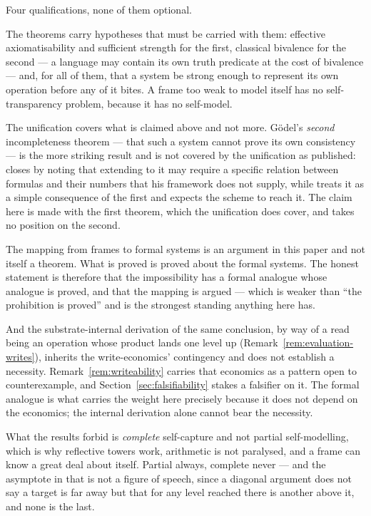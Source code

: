 \documentclass[11pt,a4paper]{article}
\theoremstyle{remark}\newtheorem{remark}[definition]{Remark}
\begin{document}
Four qualifications, none of them optional.

The theorems carry hypotheses that must be carried with them: effective axiomatisability and
sufficient strength for the first, classical bivalence for the second --- a language may contain its
own truth predicate at the cost of bivalence \citep{kripke1975} --- and, for all of them, that a
system be strong enough to represent its own operation before any of it bites. A frame too weak to
model itself has no self-transparency problem, because it has no self-model.

The unification covers what is claimed above and not more. Gödel's \emph{second} incompleteness
theorem --- that such a system cannot prove its own consistency --- is the more striking result and is
not covered by the unification as published: \citet{lawvere1969} closes by noting that extending to
it may require a specific relation between formulas and their numbers that his framework does not
supply, while \citet{yanofsky2003} treats it as a simple consequence of the first and expects the
scheme to reach it. The claim here is made with the first theorem, which the unification does cover,
and takes no position on the second.

The mapping from frames to formal systems is an argument in this paper and not itself a theorem. What
is proved is proved about the formal systems. The honest statement is therefore that the impossibility
has a formal analogue whose analogue is proved, and that the mapping is argued --- which is weaker
than ``the prohibition is proved'' and is the strongest standing anything here has.

And the substrate-internal derivation of the same conclusion, by way of a read being an operation
whose product lands one level up (Remark~\ref{rem:evaluation-writes}), inherits the write-economics'
contingency and does not establish a necessity. Remark~\ref{rem:writeability} carries that economics
as a pattern open to counterexample, and Section~\ref{sec:falsifiability} stakes a falsifier on it. The
formal analogue is what carries the weight here precisely because it does not depend on the
economics; the internal derivation alone cannot bear the necessity.

What the results forbid is \emph{complete} self-capture and not partial self-modelling, which is why
reflective towers work, arithmetic is not paralysed, and a frame can know a great deal about itself.
Partial always, complete never --- and the asymptote in that is not a figure of speech, since a
diagonal argument does not say a target is far away but that for any level reached there is another
above it, and none is the last.
\end{document}

